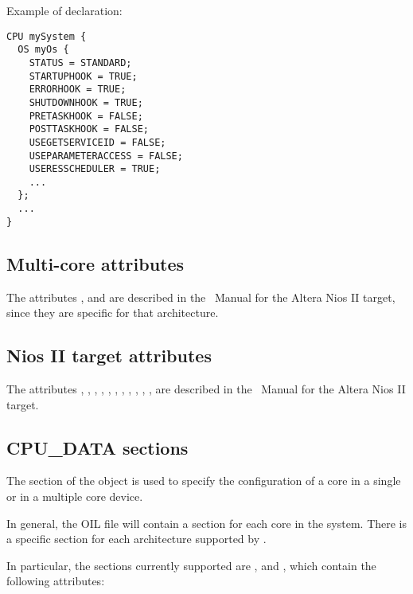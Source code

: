 Example of declaration:

\begin{lstlisting}
CPU mySystem {
  OS myOs {
    STATUS = STANDARD;
    STARTUPHOOK = TRUE;
    ERRORHOOK = TRUE;
    SHUTDOWNHOOK = TRUE;
    PRETASKHOOK = FALSE;
    POSTTASKHOOK = FALSE;
    USEGETSERVICEID = FALSE;
    USEPARAMETERACCESS = FALSE;
    USERESSCHEDULER = TRUE;
    ...
  };
  ...
}
\end{lstlisting}

\subsection{Multi-core attributes}
The attributes , and  are
described in the \ee\ Manual for the Altera Nios II target, since they
are specific for that architecture.

\subsection{Nios II target attributes}
The attributes , ,
, , ,
, , ,
, , , 
are described in the \ee\ Manual for the Altera Nios II target.

\subsection{CPU\_DATA sections}

The  section of the  object is used to specify
the configuration of a core in a single or in a multiple core device.

In general, the OIL file will contain a  section for
each core in the system. There is a specific  section
for each architecture supported by \ee. 

In particular, the  sections currently supported are
,  and , which contain the following
attributes:


